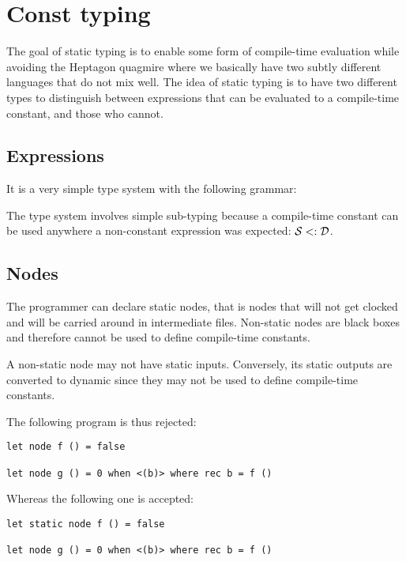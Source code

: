 \section{Const typing}

The goal of static typing is to enable some form of compile-time evaluation
while avoiding the Heptagon quagmire where we basically have two subtly
different languages that do not mix well. The idea of static typing is to have
two different types to distinguish between expressions that can be evaluated to
a compile-time constant, and those who cannot.

\subsection{Expressions}

It is a very simple type system with the following grammar:

The type system involves simple sub-typing because a compile-time constant can
be used anywhere a non-constant expression was expected: $\mathcal{S} \mathrel{<:} \mathcal{D}$.

\subsection{Nodes}

The programmer can declare static nodes, that is nodes that will not get clocked
and will be carried around in intermediate files. Non-static nodes are black
boxes and therefore cannot be used to define compile-time constants.

A non-static node may not have static inputs. Conversely, its static outputs are
converted to dynamic since they may not be used to define compile-time constants.

The following program is thus rejected:
\begin{verbatim}
let node f () = false

let node g () = 0 when <(b)> where rec b = f ()
\end{verbatim}
Whereas the following one is accepted:
\begin{verbatim}
let static node f () = false

let node g () = 0 when <(b)> where rec b = f ()
\end{verbatim}
